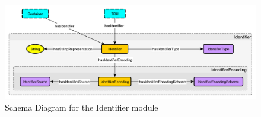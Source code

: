 
\begin{figure}[tb]
\begin{center}
\includegraphics[width=\textwidth]{diagrams/identifier}
\end{center}
\caption{Schema Diagram for the Identifier module}
\label{fig:Identifier}
\end{figure}

